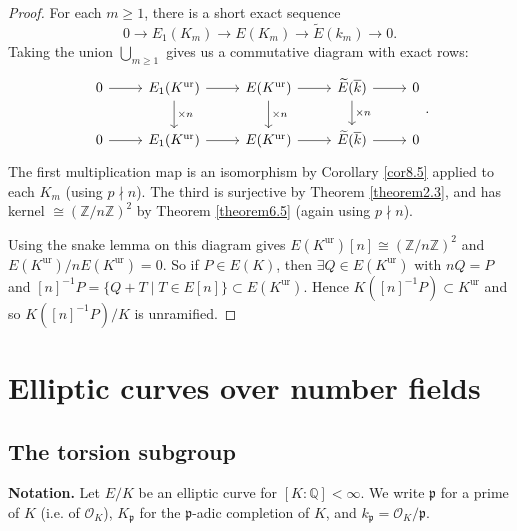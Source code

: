 \documentclass{article}
\theoremstyle{definition}
\begin{document}
\begin{proof}
    For each $m\ge 1$, there is a short exact sequence $$0 \to E_1(K_m) \to E(K_m) \to \widetilde{E}({k_m}) \to 0.$$
    Taking the union $\bigcup_{m\ge 1} $ gives us a commutative diagram with exact rows:
    $$\begin{tikzcd}[]
        0 & E_1(K^{\text{ur}}) & E(K^{\text{ur}}) & \widetilde{E}(\overline{k}) & 0 \\
        0 & E_1(K^{\text{ur}}) & E(K^{\text{ur}}) & \widetilde{E}(\overline{k}) & 0
        \arrow["", from=1-1, to=1-2]
        \arrow["", from=1-2, to=1-3]
        \arrow["", from=1-3, to=1-4]
        \arrow["", from=1-4, to=1-5]
        \arrow["", from=2-1, to=2-2]
        \arrow["", from=2-2, to=2-3]
        \arrow["", from=2-3, to=2-4]
        \arrow["", from=2-4, to=2-5]
        \arrow["\times n", from=1-2, to=2-2]
        \arrow["\times n", from=1-3, to=2-3]
        \arrow["\times n", from=1-4, to=2-4]
    \end{tikzcd}.$$
    The first multiplication map is an isomorphism by Corollary \ref{cor8.5} applied to each $K_m$ (using $p \nmid n$). The third is surjective by Theorem \ref{theorem2.3}, and has kernel $\cong (\mathbb{Z}/n\mathbb{Z})^2$ by Theorem \ref{theorem6.5} (again using $p \nmid n$).
    \vspace{1mm}
     
    Using the snake lemma on this diagram gives $E(K^{\text{ur}})[n] \cong(\mathbb{Z}/n\mathbb{Z})^2$ and $E(K^{\text{ur}})/nE(K^{\text{ur}}) = 0$. So if $P \in E(K)$, then $\exists Q \in E(K^{\text{ur}})$ with $nQ=P$ and $[n]^{-1}P = \{Q+T \mid T \in E[n]\} \subset E(K^{\text{ur}})$. Hence $K([n]^{-1}P) \subset K^{\text{ur}}$ and so $K([n]^{-1}P)/K$ is unramified.
\end{proof}
\section{Elliptic curves over number fields}
\subsection{The torsion subgroup} 
\textbf{Notation.} Let $E/K$ be an elliptic curve for $[K:\mathbb{Q}]<\infty$. We write $\mathfrak{p}$ for a prime of $K$ (i.e. of $\mathcal{O}_K$), $K_{\mathfrak{p}}$ for the $\mathfrak{p}$-adic completion of $K$, and $k_{\mathfrak{p}}=\mathcal{O}_K/\mathfrak{p}$.
\end{document}
